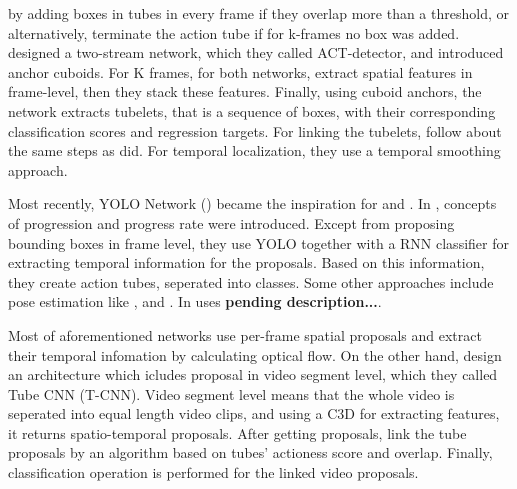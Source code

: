 \documentclass{report}
\begin{document}
by adding boxes in tubes in every frame if they overlap more than a threshold, or alternatively, terminate the action tube if for k-frames no box was added.  \cite{kalogeiton17iccv:hal-01519812}
designed a two-stream network, which they called ACT-detector, and introduced anchor cuboids. For K frames, for both networks, \cite{kalogeiton17iccv:hal-01519812} extract spatial
features in frame-level, then they stack these features. Finally, using cuboid anchors, the network extracts tubelets, that is a sequence of boxes, with their corresponding classification
scores and regression targets. For linking the tubelets, \cite{kalogeiton17iccv:hal-01519812} follow about the same steps as \cite{singh2016online} did. For temporal localization, they use
a temporal smoothing approach. \par

Most recently, YOLO Network (\cite{DBLP:journals/corr/RedmonDGF15}) became the inspiration for \cite{DBLP:journals/corr/abs-1903-00304} and
\cite{DBLP:journals/corr/abs-1802-08362}. In \cite{DBLP:journals/corr/abs-1903-00304}, concepts of progression and progress
rate were introduced. Except from proposing bounding boxes in frame level, they use YOLO together with a RNN classifier for extracting temporal information for the proposals.
Based on this information, they create action tubes, seperated into classes. Some other approaches include pose estimation like \cite{DBLP:journals/corr/abs-1802-09232}, \cite{} and
\cite{}. In \cite{DBLP:journals/corr/abs-1802-09232} uses \textbf{pending description...}. \par
Most of aforementioned networks use per-frame spatial proposals and extract their temporal infomation by calculating optical flow. On the other hand, \cite{DBLP:journals/corr/HouCS17} design
an architecture which icludes proposal in video segment level, which they called Tube CNN (T-CNN). Video segment level means that the whole video is seperated into equal length video clips, and
using a C3D for extracting features, it returns spatio-temporal proposals. After getting proposals, \cite{DBLP:journals/corr/HouCS17} link the tube proposals by an algorithm based on tubes'
actioness score and overlap. Finally, classification operation is performed for the linked video proposals.
\end{document}
